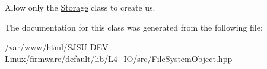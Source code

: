 Allow only the \hyperlink{classStorage}{Storage} class to create us. 



The documentation for this class was generated from the following file\+:\begin{DoxyCompactItemize}
\item 
/var/www/html/\+S\+J\+S\+U-\/\+D\+E\+V-\/\+Linux/firmware/default/lib/\+L4\+\_\+\+I\+O/src/\hyperlink{FileSystemObject_8hpp}{File\+System\+Object.\+hpp}\end{DoxyCompactItemize}

